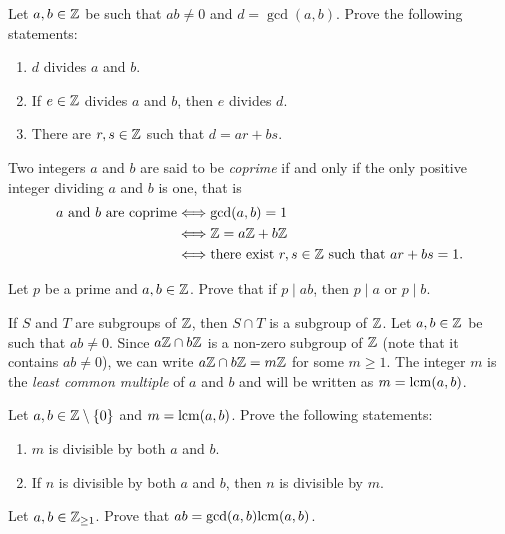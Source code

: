 \begin{exercise}
Let $a,b\in\mathbb{Z}$ be such that $ab\ne0$ and $d=\gcd(a,b)$. 
Prove the following statements:
\begin{enumerate}
\item $d$ divides $a$ and $b$.
\item If $e\in\mathbb{Z}$ divides $a$ and $b$, then $e$ divides $d$.
\item There are $r,s\in\mathbb{Z}$ such that $d=ar+bs$.
\end{enumerate}
\end{exercise}

Two integers $a$ and $b$ are said to be \emph{coprime} if 
and only if the only positive integer dividing 
$a$ and $b$ is one, that is  
\begin{align*}
a\text{ and }b\text{ are coprime}&\Longleftrightarrow \gcd(a,b)=1\\
&\Longleftrightarrow \mathbb{Z}=a\mathbb{Z}+b\mathbb{Z}\\
&\Longleftrightarrow \text{there exist $r,s\in\mathbb{Z}$ such that $ar+bs=1$.}
\end{align*}

\begin{exercise}
        Let $p$ be a prime and 
        $a,b\in\mathbb{Z}$. Prove that if $p\mid ab$, 
        then $p\mid a$ or $p\mid b$.
\end{exercise}

If $S$ and $T$ are subgroups of $\mathbb{Z}$, then $S\cap T$
is a subgroup of $\mathbb{Z}$.
Let $a,b\in\mathbb{Z}$ be such that $ab\ne 0$. Since $a\mathbb{Z}\cap b\mathbb{Z}$ 
is a non-zero subgroup of $\mathbb{Z}$ (note that it contains $ab\ne 0$), 
we can write  $a\mathbb{Z}\cap b\mathbb{Z}=m\mathbb{Z}$
for some $m\geq1$. The integer $m$
is the \emph{least common multiple} of $a$ and $b$ 
and will be written as $m=\mathrm{lcm}(a,b)$.

\begin{exercise}
Let $a,b\in\mathbb{Z}\setminus\{0\}$ and $m=\mathrm{lcm}(a,b)$. 
Prove the following statements:
\begin{enumerate}
        \item $m$ is divisible by both $a$ and $b$.
        \item If $n$ is divisible by both $a$ and $b$, then 
        $n$ is divisible by $m$.
\end{enumerate}
\end{exercise}

\begin{exercise}
Let $a,b\in\mathbb{Z}_{\geq1}$. Prove that 
$ab=\gcd(a,b)\mathrm{lcm}(a,b)$.
\end{exercise}


